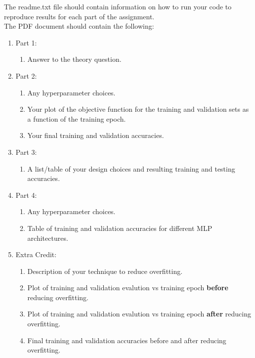 \documentclass[12pt]{article}
\begin{document}
\noindent
The readme.txt file should contain information on how to run your code to reproduce results for each part of the assignment.\\

\noindent
The PDF document should contain the following:

\begin{enumerate}
\item Part 1:
	\begin{enumerate}
	\item Answer to the theory question.
	\end{enumerate}
\item Part 2:
	\begin{enumerate}
	\item Any hyperparameter choices.
	\item Your plot of the objective function for the training and validation sets as a function of the training epoch.
	\item Your final training and validation accuracies.
	\end{enumerate}
\item Part 3:
	\begin{enumerate}
	\item A list/table of your design choices and resulting training and testing accuracies.
	\end{enumerate}
\item Part 4:
	\begin{enumerate}
	\item Any hyperparameter choices.
	\item Table of training and validation accuracies for different MLP architectures.
	\end{enumerate}
\item Extra Credit:
	\begin{enumerate}
	\item Description of your technique to reduce overfitting.
	\item Plot of training and validation evalution vs training epoch \textbf{before} reducing overfitting.
	\item Plot of training and validation evalution vs training epoch \textbf{after} reducing overfitting.
	\item Final training and validation accuracies before and after reducing overfitting.
	\end{enumerate}
\end{enumerate}
\end{document}
